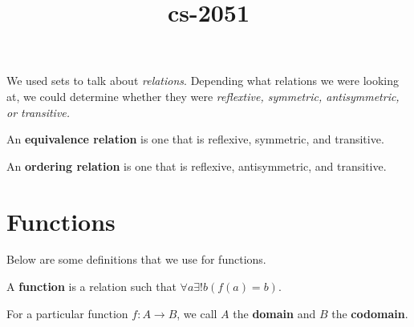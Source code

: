 \documentclass[a4paper]{article}
\title{cs-2051}
\begin{document}
    \maketitle
    \tableofcontents{}











We used sets to talk about \textit{relations}. Depending what relations we were looking at, we could determine whether they were \textit{reflextive, symmetric, antisymmetric, or transitive.}

\begin{definition}
	An \textbf{equivalence relation} is one that is reflexive, symmetric, and transitive.
\end{definition}

\begin{definition}
	An \textbf{ordering relation} is one that is reflexive, antisymmetric, and transitive.
\end{definition}

\section{Functions}

Below are some definitions that we use for functions.

\begin{definition}
	A \textbf{function} is a relation such that \( \forall a \exists !b (f(a) = b) \).
\end{definition}

\begin{definition}
	For a particular function \( f \colon A \to B  \), we call \( A \) the \textbf{domain} and \( B \) the \textbf{codomain}.
\end{definition}
\end{document}
